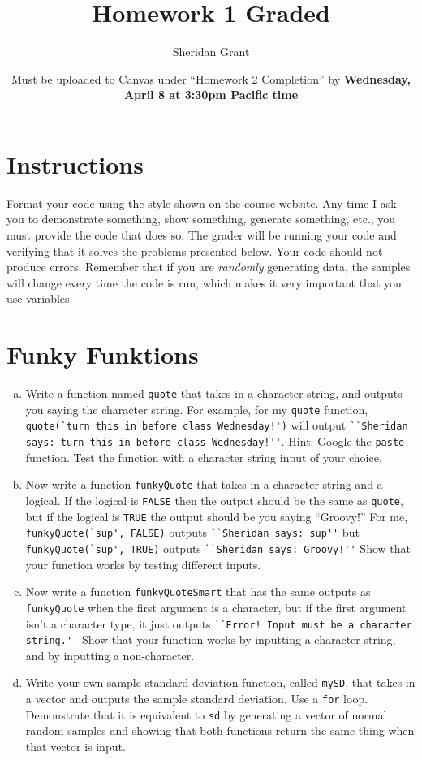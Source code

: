 \documentclass[12pt]{article}
\title{Homework 1 Graded}
\author{Sheridan Grant}
\date{Must be uploaded to Canvas under ``Homework 2 Completion'' by \textbf{Wednesday, April 8 at 3:30pm Pacific time}}
\begin{document}
\sloppy

\maketitle

\section*{Instructions}

Format your code using the style shown on the \href{https://sheridanlgrant.github.io/teaching/STAT302_SPR2020}{course website}. Any time I ask you to demonstrate something, show something, generate something, etc., you must provide the code that does so. The grader will be running your code and verifying that it solves the problems presented below. Your code should not produce errors. Remember that if you are \textit{randomly} generating data, the samples will change every time the code is run, which makes it very important that you use variables.

\section{Funky Funktions}

\begin{enumerate}[(a)]
	\item Write a function named \verb|quote| that takes in a character string, and outputs you saying the character string. For example, for my \verb|quote| function, \verb|quote(`turn this in before class Wednesday!')| will output \verb|``Sheridan says: turn this in before class Wednesday!''|. Hint: Google the \verb|paste| function. Test the function with a character string input of your choice.
	\item Now write a function \verb|funkyQuote| that takes in a character string and a logical. If the logical is \verb|FALSE| then the output should be the same as \verb|quote|, but if the logical is \verb|TRUE| the output should be you saying ``Groovy!'' For me, \verb|funkyQuote(`sup', FALSE)| outputs \verb|``Sheridan says: sup''| but \verb|funkyQuote(`sup', TRUE)| outputs \verb|``Sheridan says: Groovy!''| Show that your function works by testing different inputs.
	\item Now write a function \verb|funkyQuoteSmart| that has the same outputs as \verb|funkyQuote| when the first argument is a character, but if the first argument isn't a character type, it just outputs \verb|``Error! Input must be a character string.''| Show that your function works by inputting a character string, and by inputting a non-character.
	\item Write your own sample standard deviation function, called \verb|mySD|, that takes in a vector and outputs the sample standard deviation. Use a \verb|for| loop. Demonstrate that it is equivalent to \verb|sd| by generating a vector of normal random samples and showing that both functions return the same thing when that vector is input.
\end{enumerate}
\end{document}
